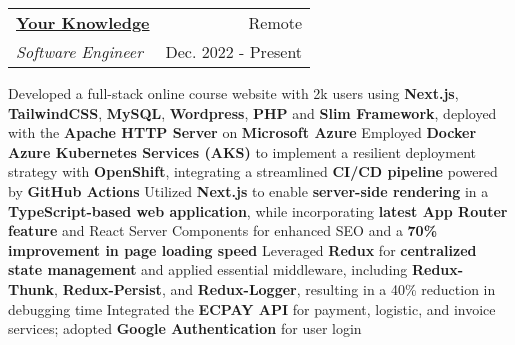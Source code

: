 \newcommand{\resumeExpEntry}[4]{
  \vspace{5pt}\item
    \begin{tabular*}{0.97\textwidth}{l@{\extracolsep{\fill}}r}
      \textbf{#1} & \small #2 \\
      \textit{#3} & \small #4 \\
    \end{tabular*}\vspace{-5pt}
}

\resumeExpEntry
{\href{https://yourknowledge.online}{Your Knowledge}}
{Remote}
{Software Engineer}
{Dec. 2022 - Present}
{
  \resumeItemListStart
    \resumeItem
    {Developed a full-stack online course website with 2k users using \textbf{Next.js}, \textbf{TailwindCSS}, \textbf{MySQL}, \textbf{Wordpress}, \textbf{PHP} and \textbf{Slim Framework}, deployed with the \textbf{Apache HTTP Server} on \textbf{Microsoft Azure}}
    \resumeItem
    {Employed \textbf{Docker} \textbf{Azure Kubernetes Services (AKS)} to implement a resilient deployment strategy with \textbf{OpenShift}, integrating a streamlined \textbf{CI/CD pipeline} powered by \textbf{GitHub Actions}}
    \resumeItem
    {Utilized \textbf{Next.js} to enable \textbf{server-side rendering} in a \textbf{TypeScript-based web application}, while incorporating \textbf{latest App Router feature} and React Server Components for enhanced SEO and a \textbf{70\% improvement in page loading speed}}
    \resumeItem
    {Leveraged \textbf{Redux} for \textbf{centralized state management} and applied essential middleware, including \textbf{Redux-Thunk}, \textbf{Redux-Persist}, and \textbf{Redux-Logger}, resulting in a 40\% reduction in debugging time}
    \resumeItem
    {Integrated the \textbf{ECPAY API} for payment, logistic, and invoice services; adopted \textbf{Google Authentication} for user login}
  \resumeItemListEnd
}

